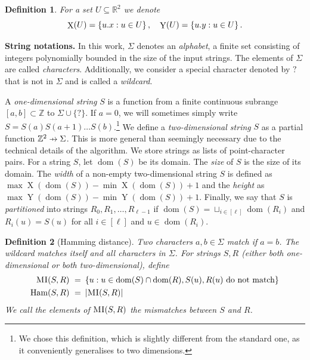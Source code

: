 \documentclass[a4paper,11pt]{article}
\newtheorem{definition}{Definition}[section]
\newcommand{\R}{\mathbb{R}}
\newcommand{\Z}{\mathbb{Z}}
\newcommand{\set}[1]{\left\lbrace #1 \right\rbrace}
\DeclareMathOperator*{\X}{X}
\DeclareMathOperator*{\Y}{Y}
\DeclareMathOperator*{\Ham}{Ham}
\DeclareMathOperator*{\dom}{dom}
\DeclareMathOperator*{\chrome}{C}
\newcommand{\absolute}[1]{\left\lvert#1\right\rvert}
\begin{document}
\begin{definition}
	For a set $U \subseteq \R^2$ we denote
	\[ \X(U) = \set{\x{u} : u \in U}, \quad \Y(U) = \set{\y{u} : u \in U}.\]
\end{definition}


\newcommand{\wild}{\texttt{?}}
\noindent \textbf{String notations.} In this work, $\Sigma$ denotes an \emph{alphabet}, a finite set consisting of integers polynomially bounded in the size of the input strings. The elements of $\Sigma$ are called \emph{characters}. Additionally, we consider a special character denoted by $\wild$ that is not in $\Sigma$ and is called a \emph{wildcard}.

\newcommand{\getchar}[1]{\chrome(#1)}
\newcommand{\pto}{\mathrel{\ooalign{\hfil$\mapstochar\mkern5mu$\hfil\cr$\to$\cr}}}
\renewcommand{\d}[1]{\dom(#1)}
\newcommand{\f}[1]{#1^\mathbf{f}}

A \emph{one-dimensional string} $S$ is a function from a finite continuous subrange $[a,b]\subset \mathbb Z$ to $\Sigma \cup \{\wild\}$. If $a = 0$, we will sometimes simply write $S = S(a)S(a+1)\ldots S(b)$.\footnote{We chose this definition, which is slightly different from the standard one, as it conveniently generalises to two dimensions.} We define a \emph{two-dimensional string} $S$ as a partial function $\Z^2 \pto \Sigma$. This is more general than seemingly necessary due to the technical details of the algorithm. We store strings as lists of point-character pairs. For a string $S$, let $\d{S}$ be its domain. The \emph{size} of $S$ is the size of its domain.
The \emph{width} of a non-empty two-dimensional string $S$ is defined as $\max \X(\d{S}) - \min \X(\d{S}) + 1$ and the \emph{height} as $\max \Y(\d{S}) - \min \Y(\d{S}) + 1$. Finally, we say that $S$ is \emph{partitioned} into strings $R_0, R_1, \ldots, R_{\ell-1}$ if $\d{S} = \sqcup_{i \in [\ell]} \d{R_i}$ and $R_i(u) = S(u)$ for all $i \in [\ell]$ and $u \in \d{R_i}$.

\newcommand{\MI}{\textnormal{\textsc{MI}}\xspace}

\begin{definition}[Hamming distance]
	Two characters $a,b \in \Sigma$ \emph{match} if $a = b$. The wildcard matches itself and all characters in $\Sigma$. 
	For strings $S, R$ (either both one-dimensional or both two-dimensional), define
	\begin{align*}
		\MI(S, R)\ =\ &\set{u : u \in \d{S} \cap \d{R}, S(u), R(u) \text{ do not match}}\\
		\Ham(S,R)\ =\ &\absolute{\MI(S,R)}
	\end{align*}			 
	We call the elements of $\MI(S,R)$ the \emph{mismatches} between $S$ and $R$.
\end{definition}
\end{document}
